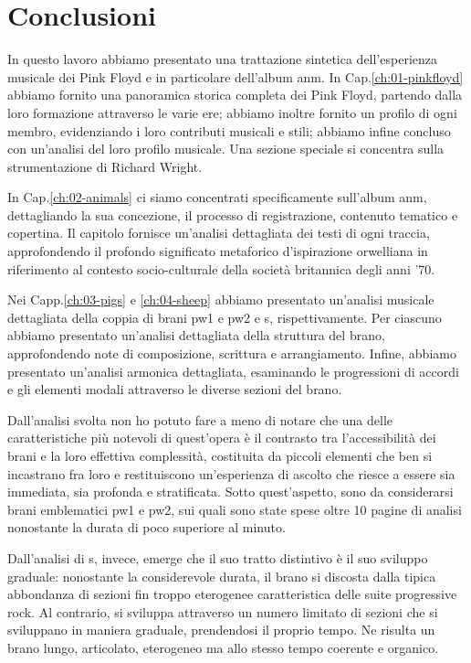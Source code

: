 \documentclass[class=book, crop=false, oneside, 12pt]{standalone}
\begin{document}
\chapter*{Conclusioni}

In questo lavoro abbiamo presentato una trattazione sintetica dell'esperienza musicale dei Pink Floyd e in particolare dell'album \acrlong{anm}. In Cap.\ref{ch:01-pinkfloyd} abbiamo fornito una panoramica storica completa dei Pink Floyd, partendo dalla loro formazione attraverso le varie ere; abbiamo inoltre fornito un profilo di ogni membro, evidenziando i loro contributi musicali e stili; abbiamo infine concluso con un'analisi del loro profilo musicale. Una sezione speciale si concentra sulla strumentazione di Richard Wright.

In Cap.\ref{ch:02-animals} ci siamo concentrati specificamente sull'album \acrshort{anm}, dettagliando la sua concezione, il processo di registrazione, contenuto tematico e copertina. Il capitolo fornisce un'analisi dettagliata dei testi di ogni traccia, approfondendo il profondo significato metaforico d'ispirazione orwelliana in riferimento al contesto socio-culturale della società britannica degli anni '70.

Nei Capp.\ref{ch:03-pigs} e \ref{ch:04-sheep} abbiamo presentato un'analisi musicale dettagliata della coppia di brani \acrlong{pw1} e \acrlong{pw2} e \acrlong{s}, rispettivamente. Per ciascuno abbiamo presentato un'analisi dettagliata della struttura del brano, approfondendo note di composizione, scrittura e arrangiamento. Infine, abbiamo presentato un'analisi armonica dettagliata, esaminando le progressioni di accordi e gli elementi modali attraverso le diverse sezioni del brano.

Dall'analisi svolta non ho potuto fare a meno di notare che una delle caratteristiche più notevoli di quest'opera è il contrasto tra l'accessibilità dei brani e la loro effettiva complessità, costituita da piccoli elementi che ben si incastrano fra loro e restituiscono un'esperienza di ascolto che riesce a essere sia immediata, sia profonda e stratificata. Sotto quest'aspetto,  sono da considerarsi brani emblematici \acrshort{pw1} e \acrshort{pw2}, sui quali sono state spese oltre 10 pagine di analisi nonostante la durata di poco superiore al minuto.

Dall'analisi di \acrshort{s}, invece, emerge che il suo tratto distintivo è il suo sviluppo graduale: nonostante la considerevole durata, il brano si discosta dalla tipica abbondanza di sezioni fin troppo eterogenee caratteristica delle suite progressive rock. Al contrario, si sviluppa attraverso un numero limitato di sezioni che si sviluppano in maniera graduale, prendendosi il proprio tempo. Ne risulta un brano lungo, articolato, eterogeneo ma allo stesso tempo coerente e organico.
\end{document}
